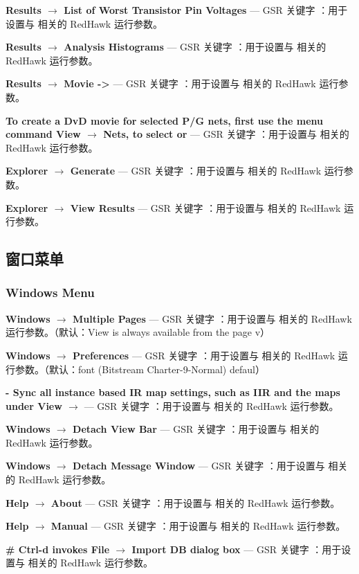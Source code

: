 \textbf{Results $\rightarrow$ List of Worst Transistor Pin Voltages} — GSR 关键字 ：用于设置与  相关的 RedHawk 运行参数。

\textbf{Results $\rightarrow$ Analysis Histograms} — GSR 关键字 ：用于设置与  相关的 RedHawk 运行参数。

\textbf{Results $\rightarrow$ Movie ->} — GSR 关键字 ：用于设置与  相关的 RedHawk 运行参数。

\textbf{To create a DvD movie for selected P/G nets, first use the menu command View $\rightarrow$ Nets, to select or} — GSR 关键字 ：用于设置与  相关的 RedHawk 运行参数。

\textbf{Explorer $\rightarrow$ Generate} — GSR 关键字 ：用于设置与  相关的 RedHawk 运行参数。

\textbf{Explorer $\rightarrow$ View Results} — GSR 关键字 ：用于设置与  相关的 RedHawk 运行参数。

\subsection{窗口菜单}
\subsubsection*{Windows Menu}

\textbf{Windows $\rightarrow$ Multiple Pages} — GSR 关键字 ：用于设置与  相关的 RedHawk 运行参数。（默认：View is always available from the page v）

\textbf{Windows $\rightarrow$ Preferences} — GSR 关键字 ：用于设置与  相关的 RedHawk 运行参数。（默认：font (Bitstream Charter-9-Normal) defaul）

\textbf{- Sync all instance based IR map settings, such as IIR and the maps under View $\rightarrow$ } — GSR 关键字 ：用于设置与  相关的 RedHawk 运行参数。

\textbf{Windows $\rightarrow$ Detach View Bar} — GSR 关键字 ：用于设置与  相关的 RedHawk 运行参数。

\textbf{Windows $\rightarrow$ Detach Message Window} — GSR 关键字 ：用于设置与  相关的 RedHawk 运行参数。

\textbf{Help $\rightarrow$ About} — GSR 关键字 ：用于设置与  相关的 RedHawk 运行参数。

\textbf{Help $\rightarrow$ Manual} — GSR 关键字 ：用于设置与  相关的 RedHawk 运行参数。

\textbf{\# Ctrl-d invokes File $\rightarrow$ Import DB dialog box} — GSR 关键字 ：用于设置与  相关的 RedHawk 运行参数。

